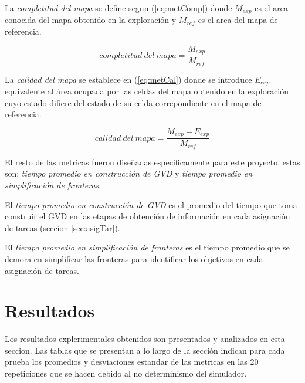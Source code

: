 
La \emph{completitud del mapa} se define segun (\ref{eq:metComp}) donde
$M_{exp}$ es el area conocida del mapa obtenido en la exploración y $M_{ref}$
es el area del mapa de referencia.

\begin{equation} \label{eq:metComp}
completitud\ del\ mapa = \frac{M_{exp}}{M_{ref}}
\end{equation}

La \emph{calidad del mapa} se establece en (\ref{eq:metCal}) donde se introduce
$E_{exp}$ equivalente al área ocupada por las celdas del mapa obtenido en
la exploración cuyo estado difiere del estado de su celda correpondiente en el
mapa de referencia.

\begin{equation} \label{eq:metCal}
calidad\ del\ mapa = \frac{M_{exp}-E_{exp}}{M_{ref}}
\end{equation}

El resto de las metricas fueron diseñadas especificamente para este proyecto,
estas son: \emph{tiempo promedio en construcción de GVD} y \emph{tiempo
promedio en simplificación de fronteras}.

El \emph{tiempo promedio en construcción de GVD} es el promedio del tiempo que
toma construir el GVD en las etapas de obtención de información en cada
asignación de tareas (seccion \ref{sec:asigTar}).

El \emph{tiempo promedio en simplificación de fronteras} es el tiempo promedio
que se demora en simplificar las fronteras para identificar los objetivos en
cada asignación de tareas.

\section{Resultados}
\newlength{\graphlen}
\setlength{\graphlen}{0.75\textwidth}


Los resultados explerimentales obtenidos son presentados y analizados en esta
seccion. Las tablas que se presentan a lo largo de la sección indican para cada
prueba los promedios y desviaciones estandar de las metricas en las 20
repeticiones que se hacen debido al no determinismo del simulador.

